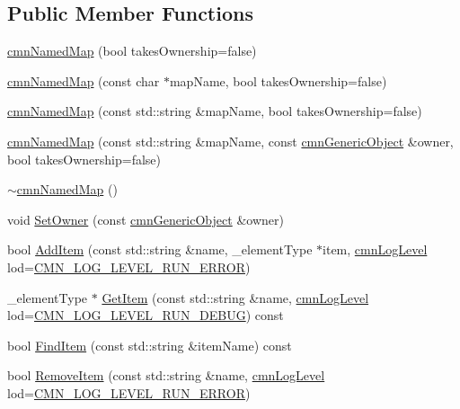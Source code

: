 \subsection*{Public Member Functions}
\begin{DoxyCompactItemize}
\item 
\hyperlink{classcmn_named_map_a4c250a20fc4693af98372a5bddf23fc3}{cmn\-Named\-Map} (bool takes\-Ownership=false)
\item 
\hyperlink{classcmn_named_map_a9204d10744786fb89a8a4c257657f7af}{cmn\-Named\-Map} (const char $\ast$map\-Name, bool takes\-Ownership=false)
\item 
\hyperlink{classcmn_named_map_aba94948e0a87cb078537dd42e3ea9da7}{cmn\-Named\-Map} (const std\-::string \&map\-Name, bool takes\-Ownership=false)
\item 
\hyperlink{classcmn_named_map_a1eb8737aa452d92dee390a1e13ed3534}{cmn\-Named\-Map} (const std\-::string \&map\-Name, const \hyperlink{classcmn_generic_object}{cmn\-Generic\-Object} \&owner, bool takes\-Ownership=false)
\item 
\hyperlink{classcmn_named_map_a79c1232b9dd2f9577cde17a81179ab00}{$\sim$cmn\-Named\-Map} ()
\item 
void \hyperlink{classcmn_named_map_add0f54de1d0383787c7ce070d24dac64}{Set\-Owner} (const \hyperlink{classcmn_generic_object}{cmn\-Generic\-Object} \&owner)
\item 
bool \hyperlink{classcmn_named_map_a0df1ea146e99d1ac628c7b51717b40df}{Add\-Item} (const std\-::string \&name, \-\_\-element\-Type $\ast$item, \hyperlink{cmn_log_lo_d_8h_a70c67165c37a0971e0dd1a85d4edaaae}{cmn\-Log\-Level} lod=\hyperlink{cmn_log_lo_d_8h_a7ace6c3eaafa3c4670c6d0dc71406e37}{C\-M\-N\-\_\-\-L\-O\-G\-\_\-\-L\-E\-V\-E\-L\-\_\-\-R\-U\-N\-\_\-\-E\-R\-R\-O\-R})
\item 
\-\_\-element\-Type $\ast$ \hyperlink{classcmn_named_map_aaebc16da1a7a806b349e7e5f7e41da09}{Get\-Item} (const std\-::string \&name, \hyperlink{cmn_log_lo_d_8h_a70c67165c37a0971e0dd1a85d4edaaae}{cmn\-Log\-Level} lod=\hyperlink{cmn_log_lo_d_8h_a285ec3fc9bf3bf806e6752070005504b}{C\-M\-N\-\_\-\-L\-O\-G\-\_\-\-L\-E\-V\-E\-L\-\_\-\-R\-U\-N\-\_\-\-D\-E\-B\-U\-G}) const 
\item 
bool \hyperlink{classcmn_named_map_ae33739318733f66074f308e6077b0cbb}{Find\-Item} (const std\-::string \&item\-Name) const 
\item 
bool \hyperlink{classcmn_named_map_a1f41463cb8ad29cc123b6eb751876239}{Remove\-Item} (const std\-::string \&name, \hyperlink{cmn_log_lo_d_8h_a70c67165c37a0971e0dd1a85d4edaaae}{cmn\-Log\-Level} lod=\hyperlink{cmn_log_lo_d_8h_a7ace6c3eaafa3c4670c6d0dc71406e37}{C\-M\-N\-\_\-\-L\-O\-G\-\_\-\-L\-E\-V\-E\-L\-\_\-\-R\-U\-N\-\_\-\-E\-R\-R\-O\-R})

\end{DoxyCompactItemize}
